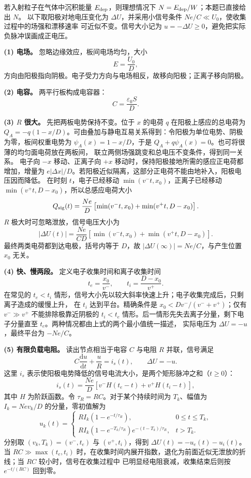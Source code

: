 \begin{xesolution}
若入射粒子在气体中沉积能量 $E_{\rm dep}$，则理想情况下 $N=E_{\rm dep}/W$；本题已直接给出 $N$。
以下取阳极对地电压变化为 $\Delta U$，并采用小信号条件 $Ne/C\ll U_0$，使收集过程中的场强和漂移速率
可近似不变。信号大小记为 $u=-\Delta U\ge0$，避免把实际负脉冲误画成正电压。

\textbf{(1) 电场。} 忽略边缘效应，板间电场均匀，大小
\[
  \boxed{E=\frac{U_0}{D}},
\]
方向由阳极指向阴极。电子受力方向与电场相反，故移向阳极；正离子移向阴极。

\textbf{(2) 电容。} 两平行板构成电容器：
\[
  \boxed{C=\frac{\varepsilon_0S}{D}}.
\]

\textbf{(3) $R$ 很大。} 先把两板电势保持不变。位于 $x$ 的电荷 $q$ 在阳极上感应的总电荷为
$Q_A=-q(1-x/D)$。可由叠加与静电互易关系得到：令阳极为单位电势、阴极为零，板间权重电势为
$\psi_A(x)=1-x/D$，于是 $Q_A+q\psi_A(x)=0$。也可将很薄的均匀面电荷放在两板间，
联立两侧场强跳变和总电压不变条件，得到同一关系。
电子向 $-x$ 移动、正离子向 $+x$ 移动时，保持阳极接地所需的感应正电荷都增加，增量为
$e|\Delta x|/D$。若阳极近似隔离，这部分正电荷不能由地补入，阳极电压因而降低。
在时刻 $t$，电子已经移动
$\min(v^-t,x_0)$，正离子已经移动 $\min(v^+t,D-x_0)$，所以总感应电荷大小
\[
  Q_{\rm sig}(t)=\frac{Ne}{D}
  \left[\min(v^-t,x_0)+\min(v^+t,D-x_0)\right].
\]
$R$ 极大时可忽略泄放，信号电压大小为
\[
  \boxed{|\Delta U(t)|=\frac{Ne}{CD}
  \left[\min(v^-t,x_0)+\min(v^+t,D-x_0)\right]}.
\]
最终两类电荷都到达电极，括号内等于 $D$，故 $|\Delta U(\infty)|=Ne/C$，与产生位置 $x_0$ 无关。

\textbf{(4) 快、慢两段。} 定义电子收集时间和离子收集时间
\[
  t_e=\frac{x_0}{v^-},\qquad t_i=\frac{D-x_0}{v^+}.
\]
在常见的 $t_e<t_i$ 情形，信号大小先以较大斜率快速上升；电子收集完成后，只剩离子造成的缓慢上升，
在 $t_i$ 达到平台。精确条件是 $x_0<Dv^-/(v^-+v^+)$；仅有 $v^-\gg v^+$ 不能排除极靠近阴极的
$t_i<t_e$ 情形。后一情形先失去离子分量，剩下电子分量直至 $t_e$。两种情况都由上式的两个最小值统一描述，
实际电压为 $\Delta U=-u$，最终平台为 $-Ne/C$。

\ionSignalFigure
{}

\textbf{(5) 有限负载电阻。} 读出节点相当于电容 $C$ 与电阻 $R$ 并联，信号满足
\[
  C\frac{\mathrm d u}{\mathrm dt}+\frac{u}{R}=i_s(t),\qquad \Delta U=-u.
\]
这里 $i_s$ 表示使阳极电势降低的信号电流大小，是两个矩形脉冲之和（$t\ge0$）：
\[
  i_s(t)=\frac{Ne}{D}\left[v^-H(t_e-t)+v^+H(t_i-t)\right],
\]
其中 $H$ 为阶跃函数。令 $\tau_R=RC$。对于某个持续时间为 $T_k$、幅值为
$I_k=Ne v_k/D$ 的分量，零初值解为
\[
  u_k(t)=
  \begin{cases}
    RI_k\left(1-e^{-t/\tau_R}\right),&0\le t\le T_k,\\[2mm]
    RI_k\left(1-e^{-T_k/\tau_R}\right)e^{-(t-T_k)/\tau_R},&t>T_k.
  \end{cases}
\]
分别取 $(v_k,T_k)=(v^-,t_e)$ 与 $(v^+,t_i)$，得到 $\Delta U(t)=-u_e(t)-u_i(t)$。当
$RC\gg\max(t_e,t_i)$ 时，在收集时间内展开指数，退化为前面近似无泄放的折线；当 $RC$ 较小时，信号在收集过程中
已明显经电阻衰减，收集结束后则按 $e^{-t/(RC)}$ 回到零。
\end{xesolution}


